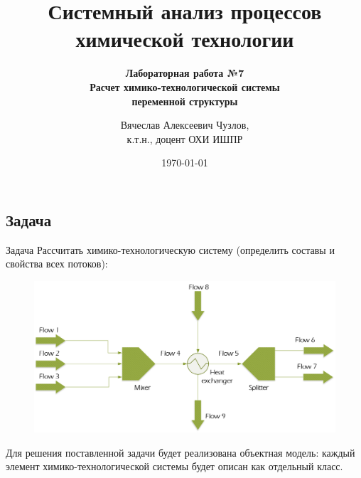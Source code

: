 \documentclass[aspectratio=169, mathserif]{beamer}%
\title{\LARGE{Системный анализ процессов химической технологии}}
\subtitle{\textcolor{tpugreen}{\textbf{Лабораторная работа №7}} \\ \textbf{Расчет химико-технологической системы \\ переменной структуры}}
\author[]{Вячеслав Алексеевич Чузлов, \\
к.т.н., доцент ОХИ ИШПР}
\date{\today}
\begin{document}
\newcommand{\pythoninline}[1]{%
	\colorbox{white}{%
		\parbox[b][.6em]{\widthof{\texttt{#1}}}{\texttt{#1}}%
	}%
}


\titleframe%



\subsection{Задача}
\begin{frame}[fragile]{Задача}
\scriptsize
Рассчитать химико-технологическую систему (определить составы и свойства всех потоков):
\vfill
\begin{figure}[h!]
\includegraphics[width=.8\textwidth]{./pics/pfd}
\end{figure}
\vfill
Для решения поставленной задачи будет реализована объектная модель: каждый элемент химико-технологической системы будет описан как отдельный класс.
\vfill
\end{frame}
\end{document}
